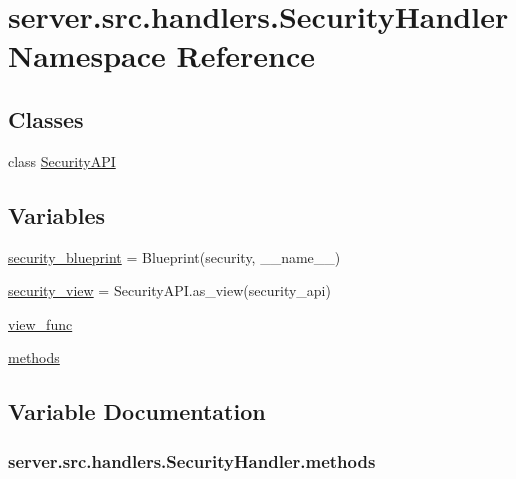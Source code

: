 \hypertarget{namespaceserver_1_1src_1_1handlers_1_1_security_handler}{}\section{server.\+src.\+handlers.\+Security\+Handler Namespace Reference}
\label{namespaceserver_1_1src_1_1handlers_1_1_security_handler}
\subsection*{Classes}
\begin{DoxyCompactItemize}
\item 
class \hyperlink{classserver_1_1src_1_1handlers_1_1_security_handler_1_1_security_a_p_i}{Security\+A\+PI}
\end{DoxyCompactItemize}
\subsection*{Variables}
\begin{DoxyCompactItemize}
\item 
\hyperlink{namespaceserver_1_1src_1_1handlers_1_1_security_handler_a6ee884f09597e3ae1848a96c670c59a6}{security\+\_\+blueprint} = Blueprint(\textquotesingle{}security\textquotesingle{}, \+\_\+\+\_\+name\+\_\+\+\_\+)
\item 
\hyperlink{namespaceserver_1_1src_1_1handlers_1_1_security_handler_a37d2ba45f3ea55adaf1dd7ba128a7127}{security\+\_\+view} = Security\+A\+P\+I.\+as\+\_\+view(\textquotesingle{}security\+\_\+api\textquotesingle{})
\item 
\hyperlink{namespaceserver_1_1src_1_1handlers_1_1_security_handler_ab4b047d7ba77f3f3a53966cf8171751c}{view\+\_\+func}
\item 
\hyperlink{namespaceserver_1_1src_1_1handlers_1_1_security_handler_ad2b2d768d34647c0b3356732a078c933}{methods}
\end{DoxyCompactItemize}


\subsection{Variable Documentation}
\subsubsection[{\texorpdfstring{methods}{methods}}]{\setlength{\rightskip}{0pt plus 5cm}server.\+src.\+handlers.\+Security\+Handler.\+methods}\hypertarget{namespaceserver_1_1src_1_1handlers_1_1_security_handler_ad2b2d768d34647c0b3356732a078c933}{}\label{namespaceserver_1_1src_1_1handlers_1_1_security_handler_ad2b2d768d34647c0b3356732a078c933}


